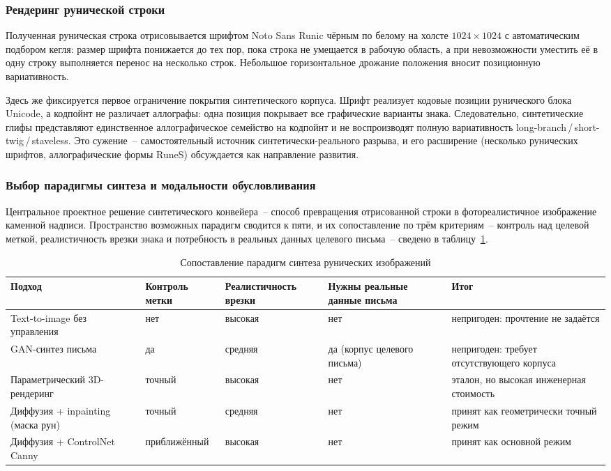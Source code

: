 \documentclass[a4paper,12pt]{extarticle}
\begin{document}
\subsubsection{Рендеринг рунической строки}
\label{sec:synth-render}
 
Полученная руническая строка отрисовывается шрифтом Noto Sans Runic чёрным по белому на холсте $1024\times1024$ с автоматическим подбором кегля: размер шрифта понижается до тех пор, пока строка не умещается в рабочую область, а при невозможности уместить её в одну строку выполняется перенос на несколько строк. Небольшое горизонтальное дрожание положения вносит позиционную вариативность. 

Здесь же фиксируется первое ограничение покрытия синтетического корпуса. Шрифт реализует кодовые позиции рунического блока Unicode, а кодпойнт не различает аллографы: одна позиция покрывает все графические варианты знака. Следовательно, синтетические глифы представляют единственное аллографическое семейство на кодпойнт и не воспроизводят полную вариативность long-branch\,/\,short-twig\,/\,staveless. Это сужение~-- самостоятельный источник синтетически-реального разрыва, и его расширение (несколько рунических шрифтов, аллографические формы RuneS) обсуждается как направление развития.
 
\subsubsection{Выбор парадигмы синтеза и модальности обусловливания}
\label{sec:synth-paradigm}
 
Центральное проектное решение синтетического конвейера~-- способ превращения отрисованной строки в фотореалистичное изображение каменной надписи. Пространство возможных парадигм сводится к пяти, и их сопоставление по трём критериям~-- контроль над целевой меткой, реалистичность врезки знака и потребность в реальных данных целевого письма~-- сведено в таблицу~\ref{tab:synth-paradigms}.
 
\begin{table}[htbp]
\centering
\caption{Сопоставление парадигм синтеза рунических изображений}
\label{tab:synth-paradigms}
\small
\begin{tabular}{p{3.3cm} p{2.5cm} p{2.3cm} p{2.0cm} p{2.6cm}}
\hline
\textbf{Подход} & \textbf{Контроль метки} & \textbf{Реалистичность врезки} & \textbf{Нужны реальные данные письма} & \textbf{Итог} \\
\hline
Text-to-image без управления & нет & высокая & нет & непригоден: прочтение не задаётся \\
GAN-синтез письма & да & средняя & да (корпус целевого письма) & непригоден: требует отсутствующего корпуса \\
Параметрический 3D-рендеринг & точный & высокая & нет & эталон, но высокая инженерная стоимость \\
Диффузия + inpainting (маска рун) & точный & средняя & нет & принят как геометрически точный режим \\
Диффузия + ControlNet Canny & приближённый & высокая & нет & принят как основной режим \\
\hline
\end{tabular}
\end{table}
 
\end{document}
